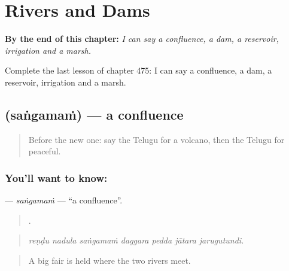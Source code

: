 
\chapter{Rivers and Dams}
\label{ch:te-rivers-and-dams}

\begin{chapteropening}
\textbf{By the end of this chapter:} \emph{I can say a confluence, a dam, a reservoir, irrigation and a marsh.}

Complete the last lesson of chapter 475: I can say a confluence, a dam, a reservoir, irrigation and a marsh.
\end{chapteropening}

\section[\texorpdfstring{\te{సంగమం} (saṅgamaṁ)}{సంగమం (saṅgamaṁ)}]{ (saṅgamaṁ) — a confluence}

\label{lesson:TE-C475-sangamam}



\begin{quote}
Before the new one: say the Telugu for a volcano, then the Telugu for peaceful.
\end{quote}

\subsection*{You'll want to know: }
\textbf{} — \emph{saṅgamaṁ} — \textquotedblleft{}a confluence\textquotedblright{}.

\begin{quote}
      .
\end{quote}

\begin{quote}
\emph{reṇḍu nadula saṅgamaṁ daggara pedda jātara jarugutundi.}
\end{quote}

\begin{quote}
A big fair is held where the two rivers meet.
\end{quote}

